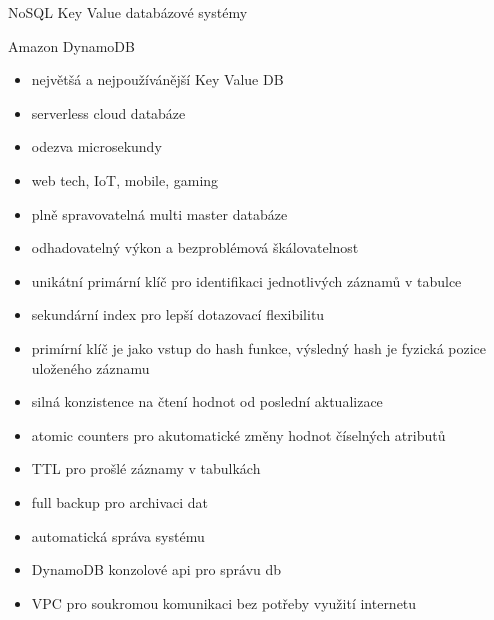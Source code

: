 \documentclass{article}
\begin{document}
	
	\begin{section}{NoSQL Key Value databázové systémy}
		\begin{subsection}{Amazon DynamoDB}
			\begin{itemize}
				\item největšá a nejpoužívánější Key Value DB
				\item serverless cloud databáze
				\item odezva microsekundy
				\item web tech, IoT, mobile, gaming
				\item plně spravovatelná multi master databáze
				\item odhadovatelný výkon a bezproblémová škálovatelnost
				\item unikátní primární klíč pro identifikaci jednotlivých záznamů v tabulce
				\item sekundární index pro lepší dotazovací flexibilitu
				\item primírní klíč je jako vstup do hash funkce, výsledný hash je fyzická pozice uloženého záznamu
				\item silná konzistence na čtení hodnot od poslední aktualizace
				\item atomic counters pro akutomatické změny hodnot číselných atributů
				\item TTL pro prošlé záznamy v tabulkách
				\item full backup pro archivaci dat
				\item automatická správa systému
				\item DynamoDB konzolové api pro správu db
				\item VPC pro soukromou komunikaci bez potřeby využití internetu
			\end{itemize}
		\end{subsection}
		

\end{section}
\end{document}
